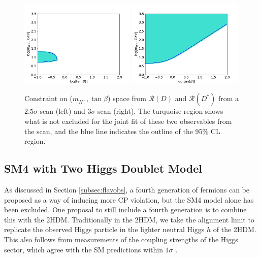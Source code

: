 \documentclass[a4paper,12pt]{article}
\begin{document}
\begin{figure}[ht]
    \centering
    \includegraphics[width=0.49\textwidth]{rd_both25sig.png}
    \includegraphics[width=0.49\textwidth]{rd_both3sig.png}
    \caption{\label{fig:rd3sig}Constraint on ($m_{H^+},\tan\beta$) space from $\mathcal{R}(D)$ and $\mathcal{R}(D^*)$ from a $2.5\sigma$ scan (left) and $3\sigma$ scan (right). 
    The turquoise region shows what is not excluded for the joint fit of these two observables from the scan, and the blue line indicates the outline of the 95\% CL region.}
\end{figure}

\subsection{SM4 with Two Higgs Doublet Model}
\label{subsec:wsl}
As discussed in Section \ref{subsec:flavobs}, a fourth generation of fermions can be proposed as a way of inducing more CP violation, but the SM4 model alone has been excluded. 
One proposal to still include a fourth generation is to combine this with the 2HDM. 
Traditionally in the 2HDM, we take the alignment limit to replicate the observed Higgs particle in the lighter neutral Higgs $h$ of the 2HDM.
This also follows from measurements of the coupling strengths of the Higgs sector, which agree with the SM predictions within $1\sigma$ \cite{couple}.
\end{document}
